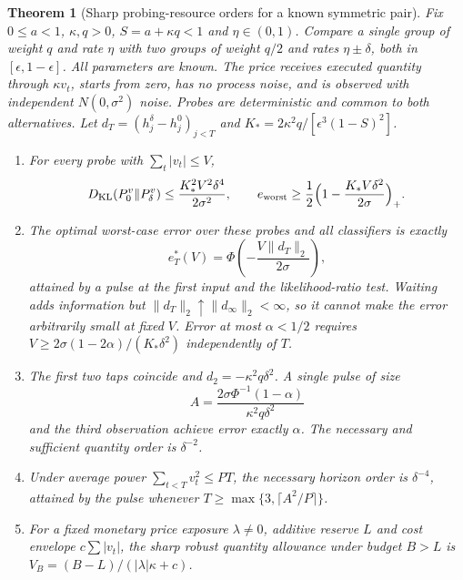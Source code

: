 \documentclass[12pt]{article}
\newtheorem{theorem}{Theorem}[section]
\theoremstyle{definition}
\theoremstyle{remark}
\newcommand{\KL}{D_{\mathrm{KL}}}
\begin{document}
\begin{theorem}[Sharp probing-resource orders for a known symmetric pair]\label{thm:quantity}
Fix $0\le a<1$, $\kappa,q>0$, $S=a+\kappa q<1$ and $\eta\in(0,1)$. Compare a single group of weight $q$ and rate $\eta$ with two groups of weight $q/2$ and rates $\eta\pm\delta$, both in $[\epsilon,1-\epsilon]$. All parameters are known. The price receives executed quantity through $\kappa v_t$, starts from zero, has no process noise, and is observed with independent $N(0,\sigma^2)$ noise. Probes are deterministic and common to both alternatives. Let $d_T=(h^\delta_j-h^0_j)_{j<T}$ and $K_*=2\kappa^2q/[\epsilon^3(1-S)^2]$.
\begin{enumerate}[label=(\roman*)]
\item For every probe with $\sum_t|v_t|\le V$,
\begin{equation}\label{eq:klV}
\KL(P_0^v\|P_\delta^v)\le\frac{K_*^2V^2\delta^4}{2\sigma^2},\qquad e_{\rm worst}\ge\frac12\Bigl(1-\frac{K_*V\delta^2}{2\sigma}\Bigr)_+ .
\end{equation}
\item The optimal worst-case error over these probes and all classifiers is exactly
\begin{equation}\label{eq:exacterr}
e^*_T(V)=\Phi\!\left(-\frac{V\|d_T\|_2}{2\sigma}\right),
\end{equation}
attained by a pulse at the first input and the likelihood-ratio test. Waiting adds information but $\|d_T\|_2\uparrow\|d_\infty\|_2<\infty$, so it cannot make the error arbitrarily small at fixed $V$. Error at most $\alpha<1/2$ requires $V\ge2\sigma(1-2\alpha)/(K_*\delta^2)$ independently of $T$.
\item The first two taps coincide and $d_2=-\kappa^2q\delta^2$. A single pulse of size
\begin{equation}\label{eq:pulse}
A=\frac{2\sigma\Phi^{-1}(1-\alpha)}{\kappa^2q\delta^2}
\end{equation}
and the third observation achieve error exactly $\alpha$. The necessary and sufficient quantity order is $\delta^{-2}$.
\item Under average power $\sum_{t<T}v_t^2\le PT$, the necessary horizon order is $\delta^{-4}$, attained by the pulse whenever $T\ge\max\{3,\lceil A^2/P\rceil\}$.
\item For a fixed monetary price exposure $\lambda\neq0$, additive reserve $L$ and cost envelope $c\sum|v_t|$, the sharp robust quantity allowance under budget $B>L$ is $V_B=(B-L)/(|\lambda|\kappa+c)$.
\end{enumerate}
\end{theorem}
\end{document}
